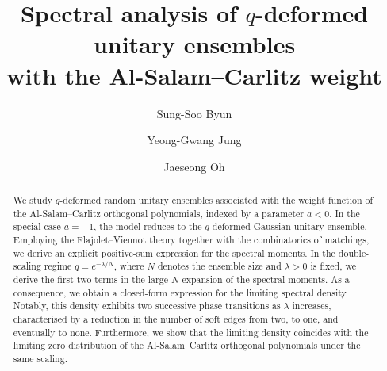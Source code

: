 \documentclass{amsart}
\theoremstyle{plain}
\theoremstyle{remark}
\numberwithin{equation}{section}
\begin{document}
\title[Spectral analysis of $q$-deformed Al-Salam--Carlitz unitary ensembles]{Spectral analysis of $q$-deformed unitary ensembles \\ with the Al-Salam--Carlitz weight}
\author{Sung-Soo Byun}
\address{Department of Mathematical Sciences and Research Institute of Mathematics, Seoul National University, Seoul 151-747, Republic of Korea}

\author{Yeong-Gwang Jung}
\address{Department of Mathematical Sciences, Seoul National University, Seoul 151-747, Republic of Korea}

\author{Jaeseong Oh}
\address{June E Huh Center for Mathematical Challenges, Korea Institute for Advanced Study, 85 Hoegiro, Dongdaemun-gu, Seoul 02455, Republic of Korea}
 


\begin{abstract} We study $q$-deformed random unitary ensembles associated with the weight function of the Al-Salam--Carlitz orthogonal polynomials, indexed by a parameter $a < 0$. In the special case $a = -1$, the model reduces to the $q$-deformed Gaussian unitary ensemble. Employing the Flajolet--Viennot theory together with the combinatorics of matchings, we derive an explicit positive-sum expression for the spectral moments. In the double-scaling regime $q = e^{-\lambda/N}$, where $N$ denotes the ensemble size and $\lambda > 0$ is fixed, we derive the first two terms in the large-$N$ expansion of the spectral moments. As a consequence, we obtain a closed-form expression for the limiting spectral density. Notably, this density exhibits two successive phase transitions as $\lambda$ increases, characterised by a reduction in the number of soft edges from two, to one, and eventually to none. Furthermore, we show that the limiting density coincides with the limiting zero distribution of the Al-Salam--Carlitz orthogonal polynomials under the same scaling.
\end{abstract}

\maketitle 
\end{document}
